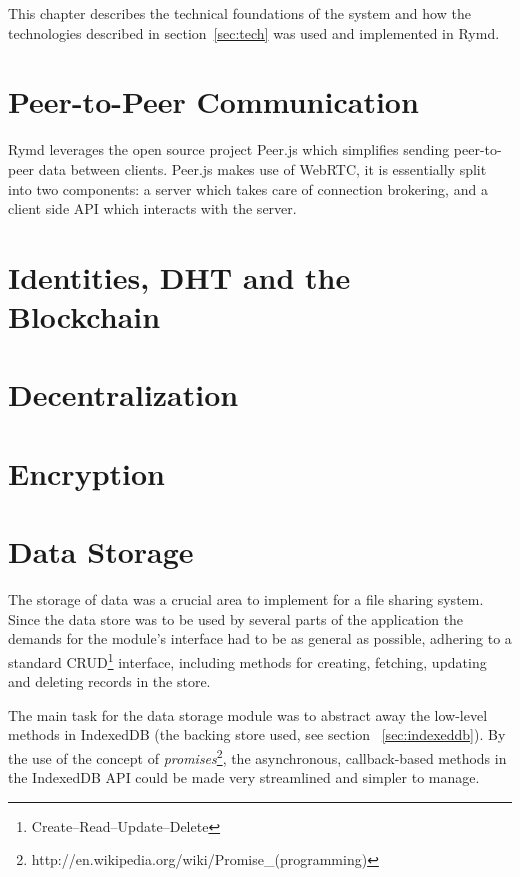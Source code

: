 This chapter describes the technical foundations of the system and  how the technologies described in section~\ref{sec:tech} was used and implemented in Rymd.

\section{Peer-to-Peer Communication}
\label{sec:p2p}


Rymd leverages the open source project Peer.js which simplifies sending peer-to-peer data between clients. Peer.js makes use of WebRTC, it is essentially split into two components: a server which takes care of connection brokering, and a client side API which interacts with the server.


\section{Identities, DHT and the Blockchain}
\label{sec:authorization}


\section{Decentralization}



\section{Encryption}
\label{sec:cryptography}


\section{Data Storage}
\label{sec:datastorage}
The storage of data was a crucial area to implement for a file sharing system. Since the data store was to be used by several parts of the application the demands for the module's interface had to be as general as possible, adhering to a standard CRUD\footnote{Create–Read–Update–Delete} interface, including methods for creating, fetching, updating and deleting records in the store.

The main task for the data storage module was to abstract away the low-level methods in IndexedDB (the backing store used, see section ~\ref{sec:indexeddb}). By the use of the concept of \emph{promises}\footnote{http://en.wikipedia.org/wiki/Promise\_(programming)}, the asynchronous, callback-based methods in the IndexedDB API could be made very streamlined and simpler to manage.

